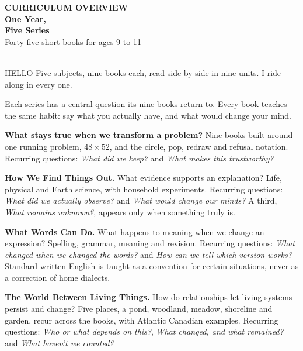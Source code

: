 \documentclass[10.5pt]{article}
\begin{document}
\thispagestyle{empty}
\vspace*{1.1cm}
\begin{center}
{\sffamily\bfseries\footnotesize\color{hudorange} CURRICULUM OVERVIEW}\\[6pt]
{\sffamily\bfseries\fontsize{26}{28}\selectfont\color{inkbrown} One Year,\\ Five Series}\\[10pt]
{\sffamily\small\color{hudnavy} Forty-five short books for ages 9 to 11}\\[1.1cm]
\bigmultix\\[1.1cm]
\begin{tally}[hudgreen]{HELLO}
Five subjects, nine books each, read side by side in nine units. I ride along in every one.
\end{tally}
\end{center}
\newpage


\begin{storybox}
Each series has a central question its nine books return to. Every book teaches the same habit: say what you actually have, and what would change your mind.
\end{storybox}

\vspace{-4pt}
\textbf{What stays true when we transform a problem?} Nine books built around one running problem, $48\times52$, and the circle, pop, redraw and refusal notation. Recurring questions: \textit{What did we keep?} and \textit{What makes this trustworthy?}

\textbf{How We Find Things Out.} What evidence supports an explanation? Life, physical and Earth science, with household experiments. Recurring questions: \textit{What did we actually observe?} and \textit{What would change our minds?} A third, \textit{What remains unknown?}, appears only when something truly is.

\textbf{What Words Can Do.} What happens to meaning when we change an expression? Spelling, grammar, meaning and revision. Recurring questions: \textit{What changed when we changed the words?} and \textit{How can we tell which version works?} Standard written English is taught as a convention for certain situations, never as a correction of home dialects.

\textbf{The World Between Living Things.} How do relationships let living systems persist and change? Five places, a pond, woodland, meadow, shoreline and garden, recur across the books, with Atlantic Canadian examples. Recurring questions: \textit{Who or what depends on this?}, \textit{What changed, and what remained?} and \textit{What haven't we counted?}
\end{document}
